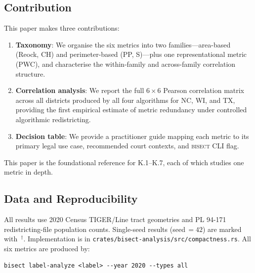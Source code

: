 \subsection{Contribution}

This paper makes three contributions:
\begin{enumerate}
  \item \textbf{Taxonomy}: We organise the six metrics into two families---area-based
    (Reock, CH) and perimeter-based (PP, S)---plus one representational metric (PWC),
    and characterise the within-family and across-family correlation structure.
  \item \textbf{Correlation analysis}: We report the full $6\times6$ Pearson
    correlation matrix across all districts produced by all four algorithms for
    NC, WI, and TX, providing the first empirical estimate of metric redundancy
    under controlled algorithmic redistricting.
  \item \textbf{Decision table}: We provide a practitioner guide mapping each
    metric to its primary legal use case, recommended court contexts, and
    \textsc{bisect} CLI flag.
\end{enumerate}

This paper is the foundational reference for K.1--K.7, each of which studies
one metric in depth.

\subsection{Data and Reproducibility}

All results use 2020 Census TIGER/Line tract geometries and PL 94-171
redistricting-file population counts.
Single-seed results (seed\,$=42$) are marked with~$^\dagger$.
Implementation is in \texttt{crates/bisect-analysis/src/compactness.rs}.
All six metrics are produced by:
\begin{verbatim}
bisect label-analyze <label> --year 2020 --types all
\end{verbatim}
